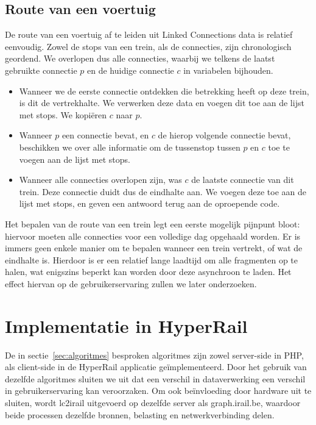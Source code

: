 \subsection{Route van een voertuig}

De route van een voertuig af te leiden uit Linked Connections data is relatief eenvoudig. Zowel de stops van een trein, als de connecties, zijn chronologisch geordend. We overlopen dus alle connecties, waarbij we telkens de laatst gebruikte connectie $p$ en de huidige connectie $c$ in variabelen bijhouden. 
\begin{itemize}
	\item Wanneer we de eerste connectie ontdekken die betrekking heeft op deze trein, is dit de vertrekhalte. We verwerken deze data en voegen dit toe aan de lijst met stops. We kopiëren $c$ naar $p$.
	\item Wanneer $p$ een connectie bevat, en $c$ de hierop volgende connectie bevat, beschikken we over alle informatie om de tussenstop tussen $p$ en $c$ toe te voegen aan de lijst met stops.
	\item Wanneer alle connecties overlopen zijn, was $c$ de laatste connectie van dit trein. Deze connectie duidt dus de eindhalte aan. We voegen deze toe aan de lijst met stops, en geven een antwoord terug aan de oproepende code.
\end{itemize}

Het bepalen van de route van een trein legt een eerste mogelijk pijnpunt bloot: hiervoor moeten alle connecties voor een volledige dag opgehaald worden. Er is immers geen enkele manier om te bepalen wanneer een trein vertrekt, of wat de eindhalte is. Hierdoor is er een relatief lange laadtijd om alle fragmenten op te halen, wat enigszins beperkt kan worden door deze asynchroon te laden. Het effect hiervan op de gebruikerservaring zullen we later onderzoeken. 

\section {Implementatie in HyperRail}
De in sectie~\ref{sec:algoritmes} besproken algoritmes zijn zowel server-side in PHP, als client-side in de HyperRail applicatie geïmplementeerd. Door het gebruik van dezelfde algoritmes sluiten we uit dat een verschil in dataverwerking een verschil in gebruikerservaring kan veroorzaken. Om ook beïnvloeding door hardware uit te sluiten, wordt lc2irail uitgevoerd op dezelfde server als graph.irail.be, waardoor beide processen dezelfde bronnen, belasting en netwerkverbinding delen.

